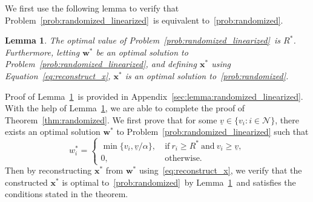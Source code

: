 \documentclass[mnsc,non-blindrev]{informs3}
\newtheorem{lemma}[theorem]{Lemma}
\theoremstyle{definition}
\begin{document}
We first use the following lemma to verify that Problem~\eqref{prob:randomized_linearized}~is equivalent to~\ref{prob:randomized}.

\vspace{0.5em}

\begin{lemma}\label{lemma:randomized_linearized}
The optimal value of Problem~\eqref{prob:randomized_linearized}~is $R^*$. Furthermore, letting $\bm{w}^*$ be an optimal solution to Problem~\eqref{prob:randomized_linearized}, and defining $\bm{x}^*$ using Equation~\eqref{eq:reconstruct_x}, $\bm{x}^*$ is an optimal solution to~\ref{prob:randomized}.
\end{lemma}

\vspace{0.5em}

Proof of Lemma~\ref{lemma:randomized_linearized}~is provided in Appendix~\ref{sec:lemma:randomized_linearized}. With the help of Lemma~\ref{lemma:randomized_linearized}, we are able to complete the proof of Theorem~\ref{thm:randomized}. We first prove that for some $\underline{v}\in\{v_i:i\in\mathcal{N}\}$, there exists an optimal solution $\bm{w}^*$ to Problem~\eqref{prob:randomized_linearized} such that
\begin{equation}\label{eq:optimal_w}
w_i^*=\begin{cases}
\min\{v_i,\underline{v}/\alpha\},\ &\text{if}\ r_i\geq R^*\ \text{and}\ v_i\geq \underline{v},\\
0,\ &\text{otherwise}.
\end{cases}
\end{equation}
Then by reconstructing $\bm{x}^*$ from $\bm{w}^*$ using~\eqref{eq:reconstruct_x}, we verify that the constructed $\bm{x}^*$ is optimal to~\ref{prob:randomized}~by Lemma~\ref{lemma:randomized_linearized}~and satisfies the conditions stated in the theorem.
\end{document}
